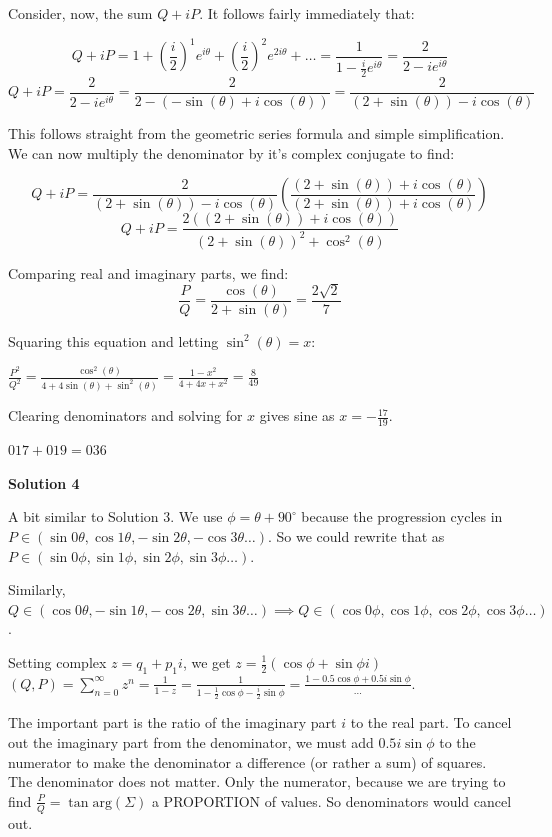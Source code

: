 \begin{enumerate}
 Consider, now, the sum $Q+iP$. It follows fairly immediately that:

 
 \[Q+iP=1+\left(\frac{i}{2}\right)^1e^{i\theta}+\left(\frac{i}{2}\right)^2e^{2i\theta}+\ldots=\frac{1}{1-\frac{i}{2}e^{i\theta}}=\frac{2}{2-ie^{i\theta}}\]
 \[Q+iP=\frac{2}{2-ie^{i\theta}}=\frac{2}{2-(-\sin(\theta)+i\cos(\theta))}=\frac{2}{(2+\sin(\theta))-i\cos(\theta)}\]

 This follows straight from the geometric series formula and simple simplification. We can now multiply the denominator by it's complex conjugate to find:

 
 \[Q+iP=\frac{2}{(2+\sin(\theta))-i\cos(\theta)}\left(\frac{(2+\sin(\theta))+i\cos(\theta)}{(2+\sin(\theta))+i\cos(\theta)}\right)\]
 \[Q+iP=\frac{2((2+\sin(\theta))+i\cos(\theta))}{(2+\sin(\theta))^2+\cos^2(\theta)}\]

 Comparing real and imaginary parts, we find:
 \[\frac{P}{Q}=\frac{\cos(\theta)}{2+\sin(\theta)}=\frac{2\sqrt{2}}{7}\]

 Squaring this equation and letting $\sin^2(\theta)=x$:

 $\frac{P^2}{Q^2}=\frac{\cos^2(\theta)}{4+4\sin(\theta)+\sin^2(\theta)}=\frac{1-x^2}{4+4x+x^2}=\frac{8}{49}$

 Clearing denominators and solving for $x$ gives sine as $x=-\frac{17}{19}$.

 $017+019=\boxed{036}$




\textbf{Solution 4}

A bit similar to Solution 3. We use $\phi = \theta+90^\circ$ because the progression cycles in $P\in (\sin 0\theta,\cos 1\theta,-\sin 2\theta,-\cos 3\theta\dots)$. So we could rewrite that as $P\in(\sin 0\phi,\sin 1\phi,\sin 2\phi,\sin 3\phi\dots)$.

 Similarly, $Q\in (\cos 0\theta,-\sin 1\theta,-\cos 2\theta,\sin 3\theta\dots)\implies Q\in(\cos 0\phi,\cos 1\phi, \cos 2\phi, \cos 3\phi\dots)$.

 Setting complex $z=q_1+p_1i$, we get $z=\frac{1}{2}\left(\cos\phi+\sin\phi i\right)$
$(Q,P)=\sum_{n=0}^\infty z^n=\frac{1}{1-z}=\frac{1}{1-\frac{1}{2}\cos\phi-\frac{i}{2}\sin\phi}=\frac{1-0.5\cos\phi+0.5i\sin\phi}{\dots}$.

 The important part is the ratio of the imaginary part $i$ to the real part. To cancel out the imaginary part from the denominator, we must add $0.5i\sin\phi$ to the numerator to make the denominator a difference (or rather a sum) of squares. The denominator does not matter. Only the numerator, because we are trying to find $\frac{P}{Q}=\tan\text{arg}(\Sigma)$ a PROPORTION of values. So denominators would cancel out.


\end{enumerate}
